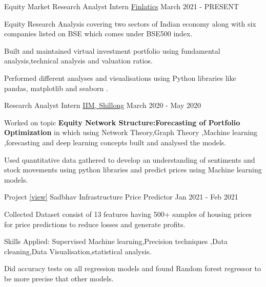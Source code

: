 
\begin{cventries}
  \cventry
    {Equity Market Research Analyst Intern} %
    {\href{https://www.finlatics.com/}{Finlatics}} %
    {} %
    {March 2021 - PRESENT} %
    {
      \begin{cvitems} %
        \item {Equity Research Analysis covering two sectors of Indian economy along with six companies listed on BSE which comes under BSE500 index. }
        \item {Built and maintained virtual investment portfolio using fundamental analysis,technical analysis and valuation ratios. }
        \item {Performed different analyses and visualisations using Python libraries like pandas, matplotlib and seaborn .}
      \end{cvitems}
    }
    
    
    \cventry
    {Research Analyst Intern} %
    {\href{https://www.iimshillong.ac.in/}{IIM, Shillong}} %
    {} %
    {March 2020 - May 2020} %
    {
      \begin{cvitems} %
        \item {Worked on topic \textbf{Equity Network Structure:Forecasting of Portfolio Optimization} in
        which using Network Theory,Graph Theory ,Machine learning ,forecasting and deep learning concepts built and analysed the models.}
        \item {Used quantitative data gathered to develop an understanding of sentiments and stock movements using python libraries and predict prices using Machine learning models.}
      \end{cvitems}
    }
 

   \cventry
    {Project \hspace{0.50cm}\href{https://github.com/PushpakMusram/Python-Programs/tree/main/ML_Project_1}{[view]}} %
    {Sadbhav Infrastructure Price Predictor} %
    {} %
    {Jan 2021 - Feb 2021} %
    {
      \begin{cvitems} %
        \item {Collected Dataset consist of 13 features having 500+ samples of housing prices for price predictions to reduce losses and generate profits.}
        \item {Skills Applied: Supervised Machine learning,Precision techniques ,Data cleaning,Data Visualisation,statistical analysis.}
        \item {Did accuracy tests on all regression models and  found Random forest regressor to be more precise that other models.}
      \end{cvitems}
    }  
\end{cventries}
